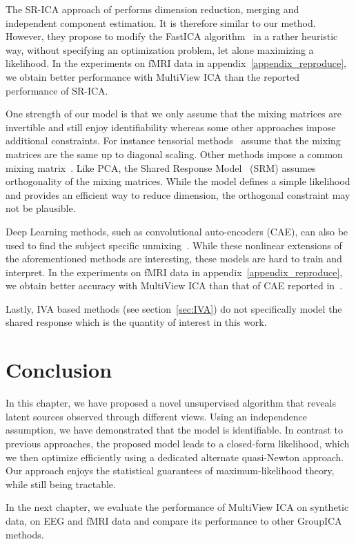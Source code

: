 The SR-ICA approach of \cite{zhang2016searchlight} performs dimension reduction, merging and independent component estimation. It is therefore similar to our method.
However, they propose to modify the FastICA algorithm~\cite{hyvarinen1999fast} in a rather heuristic way, without specifying an optimization problem, let alone maximizing a likelihood. In the experiments on fMRI data in appendix~\ref{appendix_reproduce}, we obtain better performance with MultiView ICA than the reported performance of SR-ICA.

One strength of our model is that we only assume that the mixing matrices are invertible and still enjoy identifiability whereas some other approaches impose additional constraints. For instance tensorial methods~\cite{beckmann2005tensorial} assume that the mixing matrices are the same up to diagonal scaling.
Other methods impose a common mixing matrix~\cite{cong2013validating, grin2010independent, calhoun2001fmri, Monti18UAI}. Like PCA, the Shared Response Model~\cite{chen2015reduced} (SRM) assumes orthogonality of the mixing matrices. While the model defines a simple likelihood and provides an efficient way to reduce dimension, the orthogonal constraint may not be plausible.

Deep Learning methods, such as convolutional auto-encoders (CAE), can also be used to find the subject specific unmixing~\cite{chen2016convolutional}. While these nonlinear extensions of the aforementioned methods are interesting, these models are hard to train and interpret. In the experiments on fMRI data in appendix~\ref{appendix_reproduce}, we obtain better accuracy with MultiView ICA than that of CAE reported in~\cite{chen2016convolutional}.

Lastly, IVA based methods (see section~\ref{sec:IVA}) do not specifically model
the shared response which is the quantity of interest in this work.

\section{Conclusion}
In this chapter, we have proposed a novel unsupervised algorithm that reveals latent sources observed through different views. Using an independence assumption, 
we have demonstrated that the model is identifiable.
% 
In contrast to previous approaches, the proposed model leads to a closed-form likelihood, which we then optimize efficiently using a dedicated alternate quasi-Newton approach.
% 
Our approach enjoys the statistical guarantees of maximum-likelihood theory, while still being tractable.
% 

In the next chapter, we evaluate the performance of MultiView ICA on synthetic
data, on EEG and fMRI data and compare its performance to other GroupICA methods.